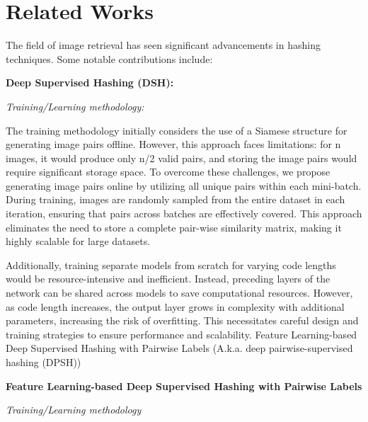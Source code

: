 \section{Related Works}

The field of image retrieval has seen significant advancements in hashing techniques. Some notable contributions include:

\textbf{Deep Supervised Hashing (DSH):}

\textit{Training/Learning methodology:}

The training methodology initially considers the use of a Siamese structure for generating image pairs offline. However, this approach faces limitations: for n images, it would produce only n/2 valid pairs, and storing the image pairs would require significant storage space. To overcome these challenges, we propose generating image pairs online by utilizing all unique pairs within each mini-batch. During training, images are randomly sampled from the entire dataset in each iteration, ensuring that pairs across batches are effectively covered. This approach eliminates the need to store a complete pair-wise similarity matrix, making it highly scalable for large datasets.

Additionally, training separate models from scratch for varying code lengths would be resource-intensive and inefficient. Instead, preceding layers of the network can be shared across models to save computational resources. However, as code length increases, the output layer grows in complexity with additional parameters, increasing the risk of overfitting. This necessitates careful design and training strategies to ensure performance and scalability.
Feature Learning-based Deep Supervised Hashing with Pairwise Labels (A.k.a. deep pairwise-supervised hashing (DPSH))

\textbf{Feature Learning-based Deep Supervised Hashing with Pairwise Labels}

\textit{Training/Learning methodology}

